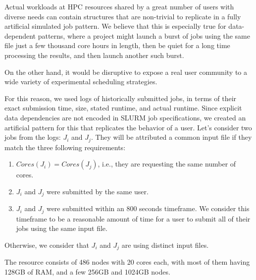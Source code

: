 \documentclass[conference,10pt]{IEEEtran}
\newcommand{\core}{\mathit{Cores}\xspace}
\begin{document}
Actual workloads at HPC resources shared by a great number of users with diverse needs can contain structures
that are non-trivial to replicate in a fully artificial simulated job pattern. We believe that this is especially
true for data-dependent patterns, where a project might launch a burst of jobs using the same file just a few thousand
core hours in length, then be quiet for a long time processing the results, and then launch another such burst.

On the other hand, it would be disruptive to expose a real user community to a wide variety of experimental scheduling strategies.

For this reason, we used logs of historically submitted jobs, in terms of their exact submission time, size, stated runtime, and actual runtime.
Since explicit data dependencies are not encoded in SLURM job specifications, we created an artificial pattern for this that replicates the behavior of a user.
Let's consider two jobs from the logs: $J_i$ and $J_j$.
They will be attributed a common input file if they match the three following requirements:
\begin{enumerate}
	\item $\core(J_i) = \core(J_j)$, i.e., they are requesting the same number of cores.
	\item $J_i$ and $J_j$ were submitted by the same user.
	\item $J_i$ and $J_j$ were submitted within an 800 seconds timeframe. We consider this timeframe to be a reasonable amount of time for a user to submit all of their jobs using the same input file.
\end{enumerate}
Otherwise, we consider that $J_i$ and $J_j$ are using distinct input files.


The resource consists of 486 nodes with 20 cores each, with most of them
having 128GB of RAM, and a few 256GB and 1024GB nodes.
\end{document}
